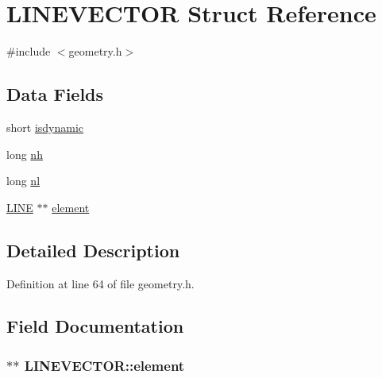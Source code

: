 \hypertarget{struct_l_i_n_e_v_e_c_t_o_r}{\section{L\-I\-N\-E\-V\-E\-C\-T\-O\-R Struct Reference}
\label{struct_l_i_n_e_v_e_c_t_o_r}
}


{\ttfamily \#include $<$geometry.\-h$>$}

\subsection*{Data Fields}
\begin{DoxyCompactItemize}
\item 
short \hyperlink{struct_l_i_n_e_v_e_c_t_o_r_a33feddd10e0eed4361868db7a1a47560}{isdynamic}
\item 
long \hyperlink{struct_l_i_n_e_v_e_c_t_o_r_a6b62904566645678ab4eea2b1cc53f32}{nh}
\item 
long \hyperlink{struct_l_i_n_e_v_e_c_t_o_r_a971db14a2f0d6e0c0d75faa36a477be1}{nl}
\item 
\hyperlink{struct_l_i_n_e}{L\-I\-N\-E} $\ast$$\ast$ \hyperlink{struct_l_i_n_e_v_e_c_t_o_r_a17e5f41d78489315e4e45006595c64b1}{element}
\end{DoxyCompactItemize}


\subsection{Detailed Description}


Definition at line 64 of file geometry.\-h.



\subsection{Field Documentation}
\hypertarget{struct_l_i_n_e_v_e_c_t_o_r_a17e5f41d78489315e4e45006595c64b1}{
\subsubsection[{element}]{$\ast$$\ast$ L\-I\-N\-E\-V\-E\-C\-T\-O\-R\-::element}}\label{struct_l_i_n_e_v_e_c_t_o_r_a17e5f41d78489315e4e45006595c64b1}


